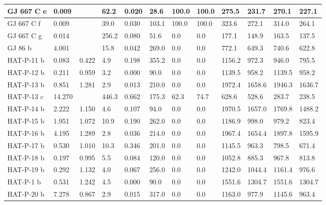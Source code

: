 \documentclass[letterpaper,10pt,english]{sphinxmanual}
\begin{document}
\begin{longtable}{|l|l|l|l|l|l|l|l|l|l|l|l|}
\hline
GJ 667 C e
 & 
0.009
 &  & 
62.2
 & 
0.020
 & 
28.6
 & 
100.0
 & 
100.0
 & 
275.5
 & 
231.7
 & 
270.1
 & 
227.1
\\
\hline
GJ 667 C f
 & 
0.009
 &  & 
39.0
 & 
0.030
 & 
103.1
 & 
100.0
 & 
100.0
 & 
323.6
 & 
272.1
 & 
314.0
 & 
264.1
\\
\hline
GJ 667 C g
 & 
0.014
 &  & 
256.2
 & 
0.080
 & 
51.6
 & 
0.0
 & 
0.0
 & 
177.1
 & 
148.9
 & 
163.5
 & 
137.5
\\
\hline
GJ 86 b
 & 
4.001
 &  & 
15.8
 & 
0.042
 & 
269.0
 & 
0.0
 & 
0.0
 & 
772.1
 & 
649.3
 & 
740.6
 & 
622.8
\\
\hline
HAT-P-11 b
 & 
0.083
 & 
0.422
 & 
4.9
 & 
0.198
 & 
355.2
 & 
0.0
 & 
0.0
 & 
1156.2
 & 
972.3
 & 
946.0
 & 
795.5
\\
\hline
HAT-P-12 b
 & 
0.211
 & 
0.959
 & 
3.2
 & 
0.000
 & 
90.0
 & 
0.0
 & 
0.0
 & 
1139.5
 & 
958.2
 & 
1139.5
 & 
958.2
\\
\hline
HAT-P-13 b
 & 
0.851
 & 
1.281
 & 
2.9
 & 
0.013
 & 
210.0
 & 
0.0
 & 
0.0
 & 
1972.4
 & 
1658.6
 & 
1946.3
 & 
1636.7
\\
\hline
HAT-P-13 c
 & 
14.270
 &  & 
446.3
 & 
0.662
 & 
175.3
 & 
62.3
 & 
74.7
 & 
628.6
 & 
528.6
 & 
283.7
 & 
238.5
\\
\hline
HAT-P-14 b
 & 
2.222
 & 
1.150
 & 
4.6
 & 
0.107
 & 
94.0
 & 
0.0
 & 
0.0
 & 
1970.5
 & 
1657.0
 & 
1769.8
 & 
1488.2
\\
\hline
HAT-P-15 b
 & 
1.951
 & 
1.072
 & 
10.9
 & 
0.190
 & 
262.0
 & 
0.0
 & 
0.0
 & 
1186.9
 & 
998.0
 & 
979.2
 & 
823.4
\\
\hline
HAT-P-16 b
 & 
4.195
 & 
1.289
 & 
2.8
 & 
0.036
 & 
214.0
 & 
0.0
 & 
0.0
 & 
1967.4
 & 
1654.4
 & 
1897.8
 & 
1595.9
\\
\hline
HAT-P-17 b
 & 
0.530
 & 
1.010
 & 
10.3
 & 
0.346
 & 
201.0
 & 
0.0
 & 
0.0
 & 
1145.5
 & 
963.3
 & 
798.5
 & 
671.4
\\
\hline
HAT-P-18 b
 & 
0.197
 & 
0.995
 & 
5.5
 & 
0.084
 & 
120.0
 & 
0.0
 & 
0.0
 & 
1052.8
 & 
885.3
 & 
967.8
 & 
813.8
\\
\hline
HAT-P-19 b
 & 
0.292
 & 
1.132
 & 
4.0
 & 
0.067
 & 
256.0
 & 
0.0
 & 
0.0
 & 
1242.0
 & 
1044.4
 & 
1161.4
 & 
976.6
\\
\hline
HAT-P-1 b
 & 
0.531
 & 
1.242
 & 
4.5
 & 
0.000
 & 
90.0
 & 
0.0
 & 
0.0
 & 
1551.6
 & 
1304.7
 & 
1551.6
 & 
1304.7
\\
\hline
HAT-P-20 b
 & 
7.278
 & 
0.867
 & 
2.9
 & 
0.015
 & 
317.0
 & 
0.0
 & 
0.0
 & 
1163.0
 & 
977.9
 & 
1145.6
 & 
963.4

\end{longtable}
\end{document}
